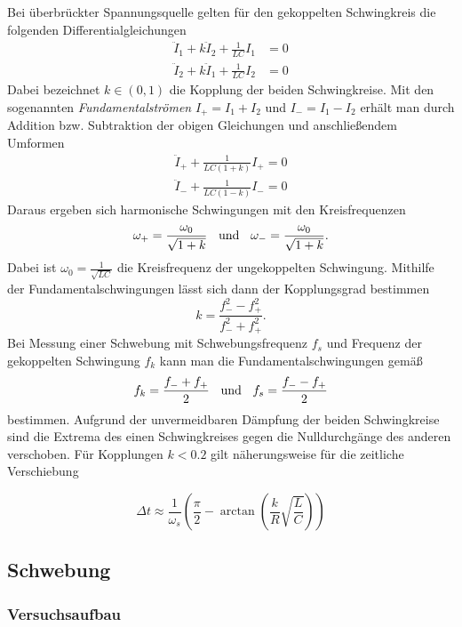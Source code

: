 Bei überbrückter Spannungsquelle gelten für den gekoppelten Schwingkreis die folgenden Differentialgleichungen 
\begin{align*}
\ddot I_1 + k \ddot I_2 + \frac{1}{LC}I_1 &= 0 \\
\ddot I_2 + k \ddot I_1 + \frac{1}{LC}I_2 &= 0
\end{align*}
Dabei bezeichnet $k \in (0,1)$ die Kopplung der beiden Schwingkreise. 
Mit den sogenannten \textit{Fundamentalströmen} $I_+ = I_1 + I_2$ und $I_- = I_1 - I_2$ erhält man durch Addition bzw. Subtraktion der obigen Gleichungen und anschließendem Umformen
\begin{align*}
\ddot I_+ + \frac{1}{LC(1+k)} I_+ = 0 \\
\ddot I_- + \frac{1}{LC(1-k)} I_- = 0
\end{align*}
Daraus ergeben sich harmonische Schwingungen mit den Kreisfrequenzen 
$$\omega_+ = \frac{\omega_0}{\sqrt{1+k}} \hspace{0.2cm} \text{ und } \hspace{0.2cm} \omega_- = \frac{\omega_0}{\sqrt{1+k}}.$$
Dabei ist $\omega_0 = \frac{1}{\sqrt{LC}}$ die Kreisfrequenz der ungekoppelten Schwingung. Mithilfe der Fundamentalschwingungen lässt sich dann der Kopplungsgrad bestimmen
$$k = \frac{f_-^2 - f_+^2}{f_-^2 + f_+^2}.$$
Bei Messung einer Schwebung mit Schwebungsfrequenz $f_s$ und Frequenz der gekoppelten Schwingung $f_k$ kann man die Fundamentalschwingungen gemäß
$$f_k = \frac{f_- + f_+}{2} \hspace{0.2cm} \text{ und } \hspace{0.2cm} f_s = \frac{f_- - f_+}{2}$$
bestimmen. Aufgrund der unvermeidbaren Dämpfung der beiden Schwingkreise sind die Extrema des einen Schwingkreises gegen die Nulldurchgänge des anderen verschoben. Für Kopplungen $k < 0.2$ gilt näherungsweise für die zeitliche Verschiebung

\begin{equation}\label{eq:delta_t}
\Delta t \approx \frac{1}{\omega_s} \left( \frac{\pi}{2} - \arctan\left(  \frac kR \sqrt{\frac LC}\right) \right)
\end{equation}



\subsection{Schwebung}


\subsubsection{Versuchsaufbau}

